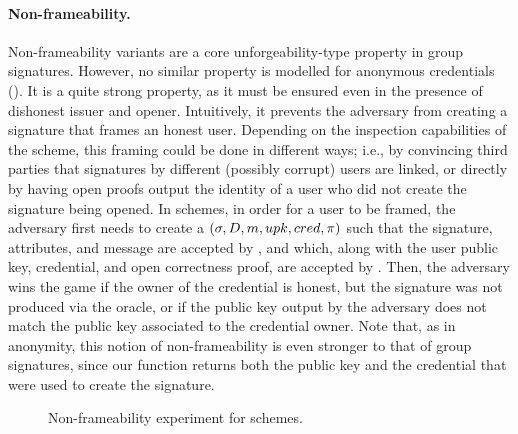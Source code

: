 \paragraph{Non-frameability.} %
Non-frameability variants are a core unforgeability-type property in group
signatures. However, no
similar property is modelled for anonymous credentials (). It is a quite strong
property, as it must be ensured even in the presence of dishonest issuer and
opener. Intuitively, it prevents the adversary from creating a signature that
frames an honest user. Depending on the inspection capabilities of the scheme,
this framing could be done in different ways; i.e., by convincing third parties
that signatures by different (possibly corrupt) users are linked, or directly
by having open proofs output the identity of a user who did not create the
signature being opened.
%
In \GSAC schemes, in order for a user to be framed, the adversary first needs to
create a $(\sigma,D,m,upk,cred,\pi)$ such that the signature,
attributes, and message are accepted by \Verify, and which, along with the user
public key, credential, and open correctness proof, are accepted by \Judge.
Then, the adversary wins the game if the owner of the credential is honest, but
the signature was not produced via the \SIGN oracle, or if the public key output
by the adversary does not match the public key associated to the credential
owner.
%
Note that, as in anonymity, this notion of non-frameability is even stronger
to that of group signatures, since our \Open function returns both the public
key and the credential that were used to create the signature.

\begin{figure}[htp!]
  \caption{Non-frameability experiment for \GSAC schemes.}
  \label{fig:exp-gsac-frame}
\end{figure}

